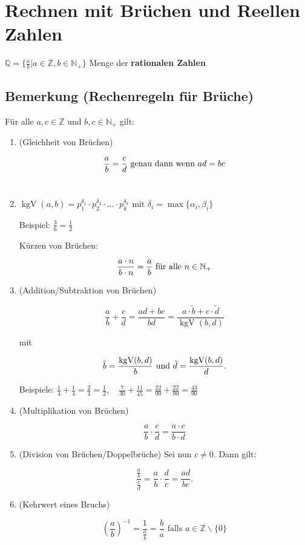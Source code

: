 \section{Rechnen mit Brüchen und Reellen Zahlen}

$\mathbb{Q}=\{\frac{a}{b}|a\in\mathbb{Z},b\in\mathbb{N_+}\}$
Menge der \textbf{rationalen Zahlen}

\subsection[Rechenregeln für Brüche]{Bemerkung (Rechenregeln für Brüche)}

	Für alle $a,c\in\mathbb{Z}$ und $b,c\in\mathbb{N_+}$ gilt:
	
	\begin{enumerate}
	
		\item (Gleichheit von Brüchen)
		
		\[
			\frac{a}{b} = \frac{c}{d} \textnormal{ genau dann wenn } ad=bc
		\]\\
		
		\item 
		
		$
			\operatorname{kgV}(a,b)=p_1^{\delta_1}\cdot p_2^{\delta_2}\cdot\ldots\cdot
			p_k^{\delta_k}\text{ mit }\delta_i=\operatorname{max}\{\alpha_i,\beta_i\}
		$
		
		Beispiel: $\frac{3}{6}=\frac{1}{2}$
		
		Kürzen von Brüchen:
		
		\[
			\frac{a\cdot n}{b\cdot n}=\frac{a}{b}\textnormal{ für alle }n\in\mathbb{N_+}
		\]
		
		\item (Addition/Subtraktion von Brüchen)
		
		\[
			\frac{a}{b}+\frac{c}{d}=\frac{ad+bc}{bd}=
			\frac{a\cdot\tilde{b}+c\cdot\tilde{d}}{\operatorname{kgV}(b,d)}
		\]
		
		mit 
		
		\[
			\tilde{b}=\frac{\operatorname{kgV}(b,d)}{b}\\
			\text{ und }\tilde{d}=\frac{\operatorname{kgV}(b,d)}{d}\text{.}
		\]
		
		Beispiele: $\frac{1}{4}+\frac{1}{4}=\frac{2}{4}=\frac{1}{2},\quad 
		\frac{7}{30}+\frac{11}{45}=\frac{22}{90}+\frac{22}{90}=\frac{43}{90}$
		
		\item (Multiplikation von Brüchen)
		
		\[
			\frac{a}{b}\cdot\frac{c}{d}=\frac{a\cdot c}{b\cdot d}
		\]
	
		\item (Division von Brüchen/Doppelbrüche)
		Sei nun $c\neq 0$. Dann gilt:
		
		\[
			\frac{\frac{a}{b}}{\frac{c}{d}}=\frac{a}{b}\cdot\frac{d}{c}=\frac{ad}{bc}\text{.}
		\]
		
		\item (Kehrwert eines Bruchs)
		
		\[
			\left(\frac{a}{b}\right)^{-1}=\frac{1}{\frac{a}{b}}=\frac{b}{a}
			\text{ falls }a\in\mathbb{Z}\backslash\{0\}
		\]
			
	\end{enumerate}
	

